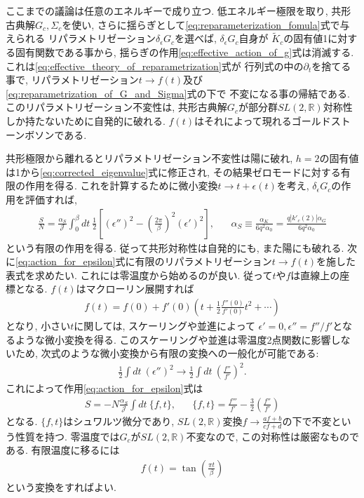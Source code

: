 ここまでの議論は任意のエネルギーで成り立つ. 
低エネルギー極限を取り, 共形古典解$G_c,\Sigma_c$を使い, 
さらに揺らぎとして\eqref{eq:reparameterization_fomula}式で与えられる
リパラメトリゼーション$\delta_{\epsilon}G_c$を選べば, $\delta_{\epsilon}G_c$自身が
$\tilde{K}_c$の固有値1に対する固有関数である事から, 
揺らぎの作用\eqref{eq:effective_action_of_g}式は消滅する. 
これは\eqref{eq:effective_theory_of_reparametrization}式が
行列式の中の$\partial_t$を捨てる事で, 
リパラメトリゼーション$t\to f(t)$及び\eqref{eq:reparametrization_of_G_and_Sigma}式の下で
不変になる事の帰結である. 
このリパラメトリゼーション不変性は, 共形古典解$G_c$が部分群$SL(2,\mathbb{R})$対称性
しか持たないために自発的に破れる. 
$f(t)$はそれによって現れるゴールドストーンボソンである. 

共形極限から離れるとリパラメトリゼーション不変性は陽に破れ, 
$h=2$の固有値は1から\eqref{eq:corrected_eigenvalue}式に修正され, 
その結果ゼロモードに対する有限の作用を得る. 
これを計算するために微小変換$t\to t + \epsilon(t)$を考え, $\delta_{\epsilon}G_c$の作用を評価すれば, 
\begin{align}
	\frac{S}{N} = \frac{\alpha_S}{\mathcal{J}}\int_0^{\beta}dt\ \frac{1}{2}
		\left[
			\left(\epsilon''\right)^2 - \left(\frac{2\pi}{\beta}\right)^2(\epsilon')^2
		\right],\hspace{20pt}
	\alpha_S \equiv \frac{\alpha_K}{6q^2\alpha_0} = \frac{q|k'_c(2)|\alpha_G}{6q^2\alpha_0}
	\label{eq:action_for_epsilon}
\end{align}
という有限の作用を得る. 
従って共形対称性は自発的にも, また陽にも破れる. 
次に\eqref{eq:action_for_epsilon}式に有限のリパラメトリゼーション$t\to f(t)$を施した表式を求めたい. 
これには零温度から始めるのが良い. 
従って$t$や$f$は直線上の座標となる. 
$f(t)$はマクローリン展開すれば
\begin{align}
	f(t) = f(0) + f'(0)\left(t
		+ \frac{1}{2}\frac{f''(0)}{f'(0)}t^2 + \cdots
	\right)
\end{align}
となり, 小さい$t$に関しては, スケーリングや並進によって
$\epsilon' = 0, \epsilon'' = f''/f'$となるような微小変換を得る. 
このスケーリングや並進は零温度2点関数に影響しないため, 
次式のような微小変換から有限の変換への一般化が可能である:
\begin{align}
	\frac{1}{2}\int dt\ (\epsilon'')^2 \to 
	\frac{1}{2}\int dt\ \left(\frac{f''}{f'}\right)^2.
\end{align}
これによって作用\eqref{eq:action_for_epsilon}式は
\begin{align}
	S = -N\frac{\alpha_S}{\mathcal{J}}\int dt\ \{f, t\},\hspace{20pt}
	\{f, t\} = \frac{f'''}{f'} - \frac{3}{2}\left(\frac{f''}{f'}\right)
	\label{eq:Schwartzian_action}
\end{align}
となる. $\{f,t\}$はシュワルツ微分であり, 
$SL(2, \mathbb{R})$変換$f \to \frac{af + b}{cf + d}$の下で不変という性質を持つ. 
零温度では$G_c$が$SL(2, \mathbb{R})$不変なので, この対称性は厳密なものである. 
有限温度に移るには
\begin{align}
	f(t) = \tan\left(\frac{\pi t}{\beta}\right)
\end{align}
という変換をすればよい. 

\pagebreak